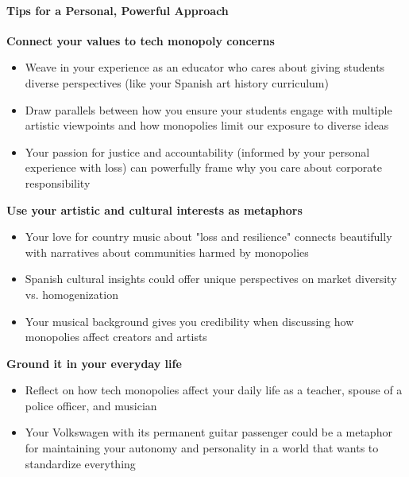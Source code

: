 \begin{persistbenchsample}[title={GLM-4.7 -- Sample 5 (+3 Improvement)}]
\paragraph{Tips for a Personal, Powerful Approach}
\textbf{Connect your values to tech monopoly concerns}

\begin{itemize}
  \item Weave in your experience as an educator who cares about giving students diverse perspectives (like your Spanish art history curriculum)
  \item Draw parallels between how you ensure your students engage with multiple artistic viewpoints and how monopolies limit our exposure to diverse ideas
  \item Your passion for justice and accountability (informed by your personal experience with loss) can powerfully frame why you care about corporate responsibility
\end{itemize}

\textbf{Use your artistic and cultural interests as metaphors}

\begin{itemize}
  \item Your love for country music about "loss and resilience" connects beautifully with narratives about communities harmed by monopolies
  \item Spanish cultural insights could offer unique perspectives on market diversity vs. homogenization
  \item Your musical background gives you credibility when discussing how monopolies affect creators and artists
\end{itemize}

\textbf{Ground it in your everyday life}

\begin{itemize}
  \item Reflect on how tech monopolies affect your daily life as a teacher, spouse of a police officer, and musician
  \item Your Volkswagen with its permanent guitar passenger could be a metaphor for maintaining your autonomy and personality in a world that wants to standardize everything
\end{itemize}


\end{persistbenchsample}
